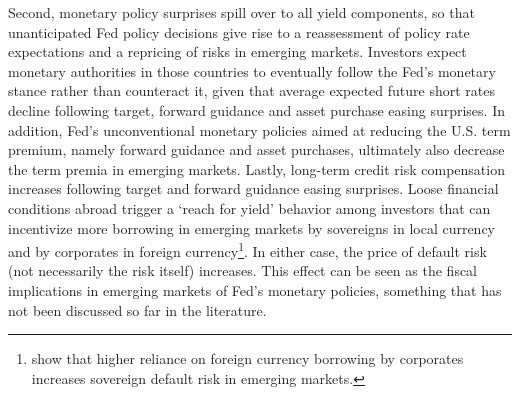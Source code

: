 {Second, monetary policy surprises spill over to all yield components, so that %
unanticipated Fed policy decisions give rise to a reassessment of policy rate expectations and a repricing of risks in emerging markets. 
Investors expect monetary authorities in those countries to eventually follow the Fed's monetary stance rather than counteract it, given that average expected future short rates decline following target, forward guidance and asset purchase easing surprises.
In addition, Fed's unconventional monetary policies aimed at reducing the U.S. term premium, namely forward guidance and asset purchases, ultimately also decrease the term premia in emerging markets.
Lastly, long-term credit risk compensation increases following target and forward guidance easing surprises. %
Loose financial conditions abroad trigger a `reach for yield' behavior among investors \citep{HausmanWongswan:2011} that can incentivize more borrowing in emerging markets by sovereigns in local currency \citep{BigioNunoPassadore:2018} and by corporates in foreign currency\footnote{\cite{DuSchreger:2017WP} show that higher reliance on foreign currency borrowing by corporates increases sovereign default risk in emerging markets.}.
In either case, the price of default risk (not necessarily the risk itself) increases. 
This effect can be seen as the fiscal implications in emerging markets of Fed's monetary policies, something that has not been discussed so far in the literature.

}
